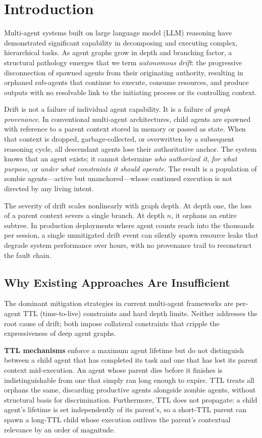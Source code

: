 \section{Introduction}
\label{sec:introduction}

Multi-agent systems built on large language model (LLM) reasoning have demonstrated significant capability in decomposing and executing complex, hierarchical tasks. As agent graphs grow in depth and branching factor, a structural pathology emerges that we term \emph{autonomous drift}: the progressive disconnection of spawned agents from their originating authority, resulting in orphaned sub-agents that continue to execute, consume resources, and produce outputs with no resolvable link to the initiating process or its controlling context.

Drift is not a failure of individual agent capability. It is a failure of \emph{graph provenance}. In conventional multi-agent architectures, child agents are spawned with reference to a parent context stored in memory or passed as state. When that context is dropped, garbage-collected, or overwritten by a subsequent reasoning cycle, all descendant agents lose their authoritative anchor. The system knows that an agent exists; it cannot determine \emph{who authorized it}, \emph{for what purpose}, or \emph{under what constraints it should operate}. The result is a population of zombie agents---active but unanchored---whose continued execution is not directed by any living intent.

The severity of drift scales nonlinearly with graph depth. At depth one, the loss of a parent context severs a single branch. At depth $n$, it orphans an entire subtree. In production deployments where agent counts reach into the thousands per session, a single unmitigated drift event can silently spawn resource leaks that degrade system performance over hours, with no provenance trail to reconstruct the fault chain.

\subsection{Why Existing Approaches Are Insufficient}

The dominant mitigation strategies in current multi-agent frameworks are per-agent TTL (time-to-live) constraints and hard depth limits. Neither addresses the root cause of drift; both impose collateral constraints that cripple the expressiveness of deep agent graphs.

\textbf{TTL mechanisms} enforce a maximum agent lifetime but do not distinguish between a child agent that has completed its task and one that has lost its parent context mid-execution. An agent whose parent dies before it finishes is indistinguishable from one that simply ran long enough to expire. TTL treats all orphans the same, discarding productive agents alongside zombie agents, without structural basis for discrimination. Furthermore, TTL does not propagate: a child agent's lifetime is set independently of its parent's, so a short-TTL parent can spawn a long-TTL child whose execution outlives the parent's contextual relevance by an order of magnitude.

